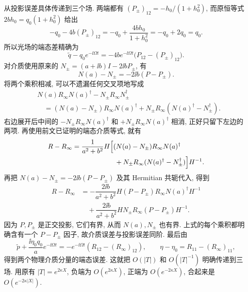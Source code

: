 \par\smallskip\noindent 从投影误差具体传递到三个场.\quad
两端都有 $(P_\pm)_{12}=-h_0/(1+h_0^2)$, 而原恒等式 $2bh_0=q_0(1+h_0^2)$ 给出
\begin{equation*}
-q_0-4b(P_\pm)_{12}
=-q_0+\dfrac{4bh_0}{1+h_0^2}
=-q_0+2q_0=q_0.
\end{equation*}
所以光场的端态差精确为
\begin{equation*}
\widetilde q-q_0e^{-\ii\Omega t}
=-4b e^{-\ii\Omega t}
\bigl(P_{12}-(P_\pm)_{12}\bigr).
\end{equation*}
对介质使用原来的 $N_\pm=(a+\ii b)I-2\ii bP_\pm$, 有
\begin{equation*}
N(a)-N_\pm=-2\ii b(P-P_\pm).
\end{equation*}
将两个乘积相减, 可以不遗漏任何交叉项地写成
\begin{align*}
&N(a)R_\infty N(a)^\dagger-N_\pm R_\infty N_\pm^\dagger\\
&\quad=(N(a)-N_\pm)R_\infty N(a)^\dagger
+N_\pm R_\infty(N(a)^\dagger-N_\pm^\dagger).
\end{align*}
右边展开后中间的 $-N_\pm R_\infty N(a)^\dagger$ 和 $+N_\pm R_\infty N(a)^\dagger$ 相消, 正好只留下左边的两项. 再使用前文已证明的端态介质等式, 就有
\begin{align*}
R-R_\infty
&=\dfrac{1}{a^2+b^2}H\Bigl[
(N(a)-N_\pm)R_\infty N(a)^\dagger\\
&\hspace{22mm}+N_\pm R_\infty(N(a)^\dagger-N_\pm^\dagger)
\Bigr]H^{-1}.
\end{align*}
再把 $N(a)-N_\pm=-2\ii b(P-P_\pm)$ 及其 Hermitian 共轭代入, 得到
\begin{align*}
R-R_\infty
&=-\dfrac{2\ii b}{a^2+b^2}H(P-P_\pm)R_\infty N(a)^\dagger H^{-1}\\
&\quad+\dfrac{2\ii b}{a^2+b^2}HN_\pm R_\infty(P-P_\pm)H^{-1}.
\end{align*}
因为 $P,P_\pm$ 是正交投影, 它们有界, 从而 $N(a),N_\pm$ 也有界. 上式的每个乘积都明确含有一个 $P-P_\pm$ 因子, 故介质误差与投影误差同阶. 最后由
\begin{equation*}
\widetilde p+\dfrac{\ii\eta_0q_0}{a}e^{-\ii\Omega t}
=-e^{-\ii\Omega t}(R_{12}-(R_\infty)_{12}),
\qquad
\eta-\eta_0=R_{11}-(R_\infty)_{11},
\end{equation*}
得到两个物理介质分量的端态误差. 这就把 $O(|T|)$ 和 $O(|T|^{-1})$ 明确传递到三场. 用原有 $|T|=e^{2\kappa X}$, 负端为 $O(e^{2\kappa X})$, 正端为 $O(e^{-2\kappa X})$, 合起来是 $O(e^{-2\kappa|X|})$.


